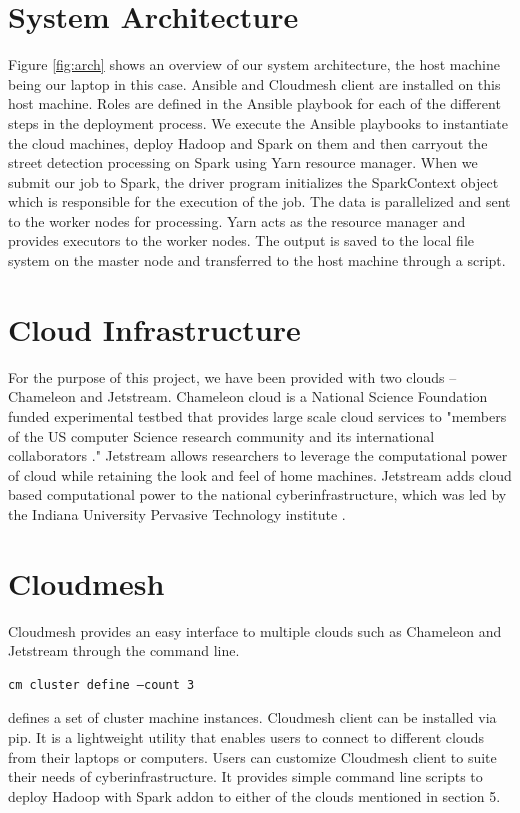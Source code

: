 \documentclass[9pt,twocolumn,twoside]{../../styles/osajnl}
\begin{document}
\section{System Architecture}

Figure \ref{fig:arch} shows an overview of our system architecture,
the host machine being our laptop in this case. Ansible and Cloudmesh
client are installed on this host machine. Roles are defined in the
Ansible playbook for each of the different steps in the deployment
process. We execute the Ansible playbooks to instantiate the cloud
machines, deploy Hadoop and Spark on them and then carryout the street
detection processing on Spark using Yarn resource manager. When we
submit our job to Spark, the driver program initializes the
SparkContext object which is responsible for the execution of the
job. The data is parallelized and sent to the worker nodes for
processing. Yarn acts as the resource manager and provides executors
to the worker nodes. The output is saved to the local file system on
the master node and transferred to the host machine through a script.

\section{Cloud Infrastructure}
For the purpose of this project, we have been provided with two clouds
– Chameleon and Jetstream.  Chameleon cloud is a National Science
Foundation funded experimental testbed that provides large scale cloud
services to "members of the US computer Science research community and
its international collaborators \cite{www-chameleon}." Jetstream
allows researchers to leverage the computational power of cloud while
retaining the look and feel of home machines. Jetstream adds cloud
based computational power to the national cyberinfrastructure, which
was led by the Indiana University Pervasive Technology institute
\cite{www-jetstream}.

\section{Cloudmesh}
Cloudmesh provides an easy interface to multiple clouds such as
Chameleon and Jetstream through the command line.
\begin{verbatim} 
cm cluster define –count 3
\end{verbatim} 
defines a set of cluster machine instances.  Cloudmesh client can be
installed via pip. It is a lightweight utility that enables users to
connect to different clouds from their laptops or computers. Users can
customize Cloudmesh client to suite their needs of
cyberinfrastructure. It provides simple command line scripts to deploy
Hadoop with Spark addon to either of the clouds mentioned in section
5.
\end{document}
